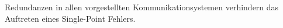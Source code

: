 \documentclass[twoside]{article}
\begin{document}
\begin{multicols}{2}
\begin{table}[H]
         \end{table}
         Redundanzen in allen vorgestellten Kommunikationsystemen verhindern 
         das Auftreten eines Single-Point Fehlers.



\end{multicols}
\end{document}
